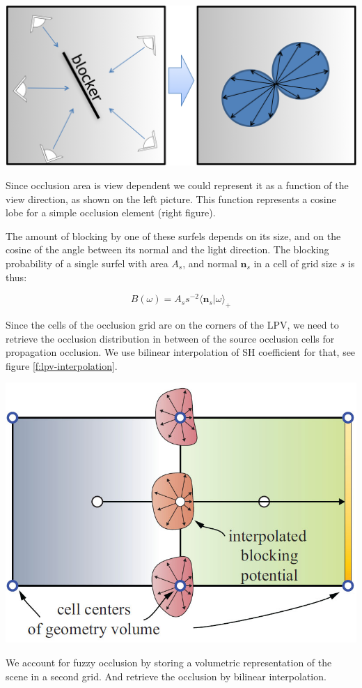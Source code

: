 \begin{marginfigure}
	\includegraphics{graphics/lpv/lpv-5-1}
	\caption{Since occlusion area is view dependent we could represent it as a function of the view direction, as shown on the left picture. This function represents a cosine lobe for a simple occlusion element (right figure).}
	\label{f:lpv-occlusion-grid}
\end{marginfigure}

The amount of blocking by one of these surfels depends on its size, and on the cosine of the angle between its normal and the light direction. The blocking probability of a single surfel with area $A_s$, and normal $\mathbf{n}_s$ in a cell of grid size $s$ is thus:

\begin{equation*}
	B(\omega)=A_s s^{-2}\langle \mathbf{n}_s|\omega\rangle _+
\end{equation*} 

Since the cells of the occlusion grid are on the corners of the LPV, we need to retrieve the occlusion distribution in between of the source occlusion cells for propagation occlusion. We use bilinear interpolation of SH coefficient for that, see figure \ref{f:lpv-interpolation}.

\begin{marginfigure}
	\includegraphics{graphics/lpv/lpv-5-2}
	\caption{We account for fuzzy occlusion by storing a volumetric representation of the scene in a second grid. And retrieve the occlusion by bilinear interpolation.}
	\label{f:lpv-interpolation}
\end{marginfigure}




